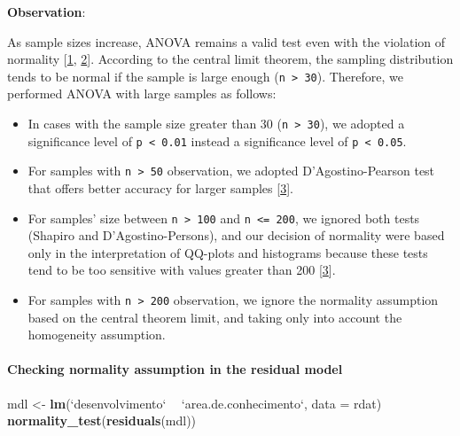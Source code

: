 \documentclass[]{article}
\newenvironment{Shaded}{\begin{snugshade}}{\end{snugshade}}
\newcommand{\DataTypeTok}[1]{\textcolor[rgb]{0.13,0.29,0.53}{#1}}
\newcommand{\KeywordTok}[1]{\textcolor[rgb]{0.13,0.29,0.53}{\textbf{#1}}}
\newcommand{\NormalTok}[1]{#1}
\newcommand{\OperatorTok}[1]{\textcolor[rgb]{0.81,0.36,0.00}{\textbf{#1}}}
\newcommand{\StringTok}[1]{\textcolor[rgb]{0.31,0.60,0.02}{#1}}
\let\oldparagraph\paragraph
\renewcommand{\paragraph}[1]{\oldparagraph{#1}\mbox{}}
\begin{document}
\textbf{Observation}:

As sample sizes increase, ANOVA remains a valid test even with the
violation of normality {[}\protect\hyperlink{references}{1},
\protect\hyperlink{references}{2}{]}. According to the central limit
theorem, the sampling distribution tends to be normal if the sample is
large enough (\texttt{n\ \textgreater{}\ 30}). Therefore, we performed
ANOVA with large samples as follows:

\begin{itemize}
\item
  In cases with the sample size greater than 30
  (\texttt{n\ \textgreater{}\ 30}), we adopted a significance level of
  \texttt{p\ \textless{}\ 0.01} instead a significance level of
  \texttt{p\ \textless{}\ 0.05}.
\item
  For samples with \texttt{n\ \textgreater{}\ 50} observation, we
  adopted D'Agostino-Pearson test that offers better accuracy for larger
  samples {[}\protect\hyperlink{references}{3}{]}.
\item
  For samples' size between \texttt{n\ \textgreater{}\ 100} and
  \texttt{n\ \textless{}=\ 200}, we ignored both tests (Shapiro and
  D'Agostino-Persons), and our decision of normality were based only in
  the interpretation of QQ-plots and histograms because these tests tend
  to be too sensitive with values greater than 200
  {[}\protect\hyperlink{references}{3}{]}.
\item
  For samples with \texttt{n\ \textgreater{}\ 200} observation, we
  ignore the normality assumption based on the central theorem limit,
  and taking only into account the homogeneity assumption.
\end{itemize}

\hypertarget{checking-normality-assumption-in-the-residual-model}{%
\paragraph{Checking normality assumption in the residual
model}\label{checking-normality-assumption-in-the-residual-model}}

\begin{Shaded}
\begin{Highlighting}[]
\NormalTok{mdl <-}\StringTok{ }\KeywordTok{lm}\NormalTok{(}\StringTok{`}\DataTypeTok{desenvolvimento}\StringTok{`} \OperatorTok{~}\StringTok{ `}\DataTypeTok{area.de.conhecimento}\StringTok{`}\NormalTok{, }\DataTypeTok{data =}\NormalTok{ rdat)}
\KeywordTok{normality_test}\NormalTok{(}\KeywordTok{residuals}\NormalTok{(mdl))}
\end{Highlighting}
\end{Shaded}
\end{document}
